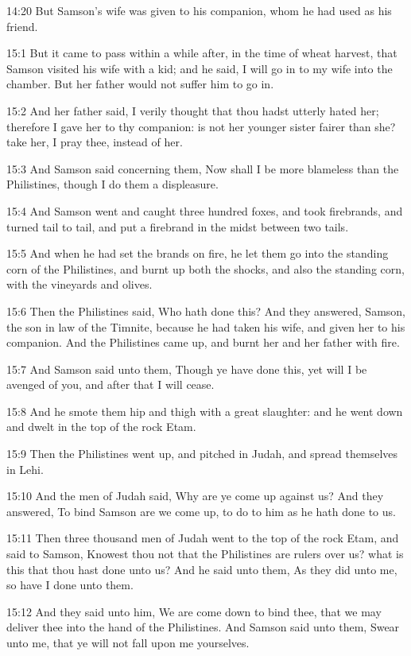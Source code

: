 14:20 But Samson's wife was given to his companion, whom he had used
as his friend.

15:1 But it came to pass within a while after, in the time of wheat
harvest, that Samson visited his wife with a kid; and he said, I will
go in to my wife into the chamber. But her father would not suffer him
to go in.

15:2 And her father said, I verily thought that thou hadst utterly
hated her; therefore I gave her to thy companion: is not her younger
sister fairer than she? take her, I pray thee, instead of her.

15:3 And Samson said concerning them, Now shall I be more blameless
than the Philistines, though I do them a displeasure.

15:4 And Samson went and caught three hundred foxes, and took
firebrands, and turned tail to tail, and put a firebrand in the midst
between two tails.

15:5 And when he had set the brands on fire, he let them go into the
standing corn of the Philistines, and burnt up both the shocks, and
also the standing corn, with the vineyards and olives.

15:6 Then the Philistines said, Who hath done this? And they answered,
Samson, the son in law of the Timnite, because he had taken his wife,
and given her to his companion. And the Philistines came up, and burnt
her and her father with fire.

15:7 And Samson said unto them, Though ye have done this, yet will I
be avenged of you, and after that I will cease.

15:8 And he smote them hip and thigh with a great slaughter: and he
went down and dwelt in the top of the rock Etam.

15:9 Then the Philistines went up, and pitched in Judah, and spread
themselves in Lehi.

15:10 And the men of Judah said, Why are ye come up against us? And
they answered, To bind Samson are we come up, to do to him as he hath
done to us.

15:11 Then three thousand men of Judah went to the top of the rock
Etam, and said to Samson, Knowest thou not that the Philistines are
rulers over us? what is this that thou hast done unto us? And he said
unto them, As they did unto me, so have I done unto them.

15:12 And they said unto him, We are come down to bind thee, that we
may deliver thee into the hand of the Philistines. And Samson said
unto them, Swear unto me, that ye will not fall upon me yourselves.

